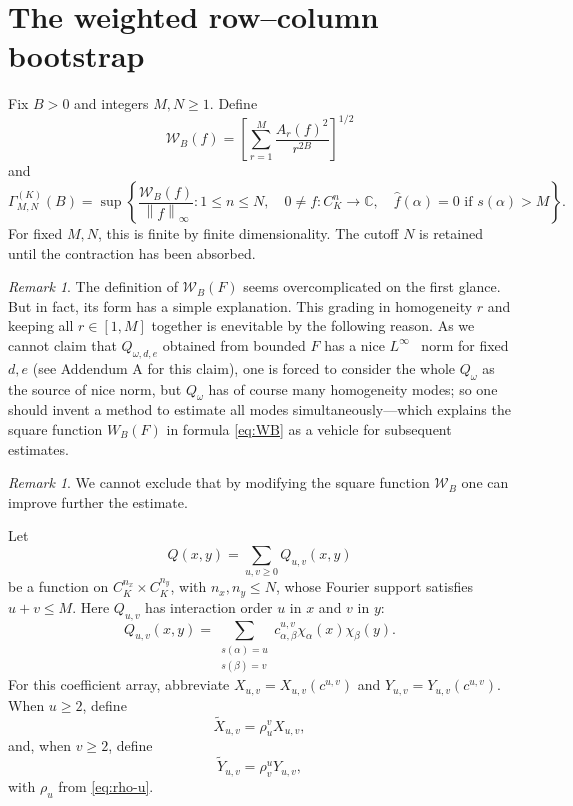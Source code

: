 \documentclass[11pt]{article}
\theoremstyle{definition}
\theoremstyle{remark}
\newtheorem{remark}[theorem]{Remark}
\newcommand{\C}{\mathbb{C}}
\newcommand{\wh}{\widehat}
\newcommand{\norm}[1]{\left\lVert #1\right\rVert}
\begin{document}
\section{The weighted row--column bootstrap}

Fix $B>0$ and integers $M,N\ge1$.  Define
\begin{equation}
\label{eq:WB}
 \mathcal W_B(f)=
 \left[\sum_{r=1}^M\frac{A_r(f)^2}{r^{2B}}\right]^{1/2}
\end{equation}
and
\begin{equation}
\label{eq:Gamma}
 \Gamma^{(K)}_{M,N}(B)
 =\sup\left\{
 \frac{\mathcal W_B(f)}{\norm f_\infty}:
 1\le n\le N,\quad 0\ne f:C_K^n\to\C,\quad
 \wh f(\alpha)=0\text{ if }s(\alpha)>M
 \right\}.
\end{equation}
For fixed $M,N$, this is finite by finite dimensionality.  The cutoff $N$ is
retained until the contraction has been absorbed.

\begin{remark}
The definition of $ \mathcal W_B(F)$ seems overcomplicated on the first glance. But in fact, its form has a simple explanation.
This grading in  homogeneity $r$ and keeping all $r\in [1, M]$ together is enevitable by the following reason.  
As we cannot claim that $Q_{\omega, d, e}$ obtained from bounded $F$ has a nice $L^\infty$  norm for fixed $d, e$ (see Addendum A for this claim), 
one is forced to consider the whole $Q_{\omega}$ as the source of nice norm, but $Q_\omega $
has of course many homogeneity modes; 
so one should invent a method to estimate all modes simultaneously—which explains the square function $W_B(F)$ in formula \eqref{eq:WB}
 as a vehicle for 
subsequent estimates. 
\end{remark}

\begin{remark}
We cannot exclude that by modifying the square function $\mathcal W_B$ one can improve further the estimate.
\end{remark}

Let
\begin{equation}
\label{eq:Q-bidecomp}
 Q(x,y)=\sum_{u,v\ge0}Q_{u,v}(x,y)
\end{equation}
be a function on $C_K^{n_x}\times C_K^{n_y}$, with $n_x,n_y\le N$, whose
Fourier support satisfies $u+v\le M$.  Here $Q_{u,v}$ has interaction order
$u$ in $x$ and $v$ in $y$:
\begin{equation}
\label{eq:Quv}
 Q_{u,v}(x,y)
 =\sum_{\substack{s(\alpha)=u\\s(\beta)=v}}
 c^{u,v}_{\alpha,\beta}\chi_\alpha(x)\chi_\beta(y).
\end{equation}
For this coefficient array, abbreviate $X_{u,v}=X_{u,v}(c^{u,v})$ and
$Y_{u,v}=Y_{u,v}(c^{u,v})$.  When $u\ge2$, define
\begin{equation}
\label{eq:Xtilde}
 \widetilde X_{u,v}=\rho_u^vX_{u,v},
\end{equation}
and, when $v\ge2$, define
\begin{equation}
\label{eq:Ytilde}
 \widetilde Y_{u,v}=\rho_v^uY_{u,v},
\end{equation}
with $\rho_u$ from \eqref{eq:rho-u}.
\end{document}
